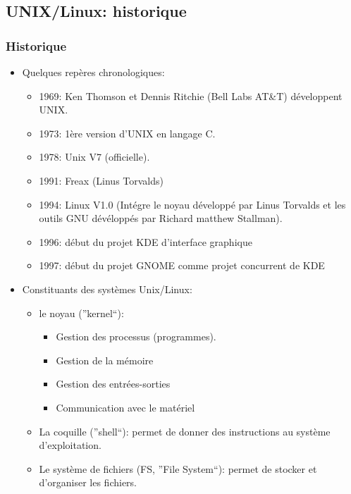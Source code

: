 \documentclass[10pt, xcolor=dvipsnames]{beamer}
\begin{document}
\subsection{UNIX/Linux: historique}
\frame
{
\frametitle{Historique}
\begin{itemize}
 \item Quelques repères chronologiques:
      \begin{itemize}
            \item 1969: Ken Thomson et Dennis Ritchie (Bell Labs AT\&T) développent UNIX. 
            \item 1973: 1ère version d'UNIX en langage C.
            \item 1978: Unix V7 (officielle).
            \item 1991: Freax (Linus Torvalds)
            \item 1994: Linux V1.0 (Intégre le noyau développé par Linus Torvalds et les outils GNU dévéloppés par Richard matthew Stallman).
            \item 1996: début du projet KDE d'interface graphique
            \item 1997: début du projet GNOME comme projet concurrent de KDE
      \end{itemize} 
\end{itemize}

}



\frame
{

  \begin{itemize}
  \item Constituants des systèmes Unix/Linux:
      \begin{itemize}
         \item le noyau (''kernel``): 
         \begin{itemize}                   
                   \item Gestion des processus (programmes).
                   \item Gestion de la mémoire
                   \item Gestion des entrées-sorties
                   \item Communication avec le matériel
           \end{itemize}
  \item La coquille  (''shell``): permet de donner des instructions au système d'exploitation.
  \item Le système de fichiers (FS, ''File System``): permet de stocker et d'organiser les fichiers.
 \end{itemize} 
\end{itemize}
}
\end{document}
